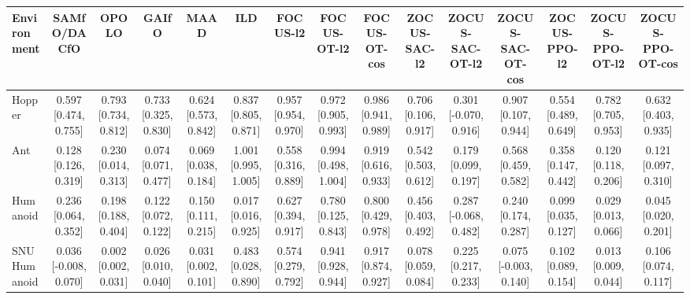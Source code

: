 \begin{tabular}{lcccccccccccccc}
\toprule
Environment & SAMfO/DACfO & OPOLO & GAIfO & MAAD & ILD & FOCUS-l2 & FOCUS-OT-l2 & FOCUS-OT-cos & ZOCUS-SAC-l2 & ZOCUS-SAC-OT-l2 & ZOCUS-SAC-OT-cos & ZOCUS-PPO-l2 & ZOCUS-PPO-OT-l2 & ZOCUS-PPO-OT-cos \\
\midrule
Hopper & 0.597 [0.474, 0.755] & 0.793 [0.734, 0.812] & 0.733 [0.325, 0.830] & 0.624 [0.573, 0.842] & 0.837 [0.805, 0.871] & 0.957 [0.954, 0.970] & 0.972 [0.905, 0.993] & 0.986 [0.941, 0.989] & 0.706 [0.106, 0.917] & 0.301 [-0.070, 0.916] & 0.907 [0.107, 0.944] & 0.554 [0.489, 0.649] & 0.782 [0.705, 0.953] & 0.632 [0.403, 0.935] \\
Ant & 0.128 [0.126, 0.319] & 0.230 [0.014, 0.313] & 0.074 [0.071, 0.477] & 0.069 [0.038, 0.184] & 1.001 [0.995, 1.005] & 0.558 [0.316, 0.889] & 0.994 [0.498, 1.004] & 0.919 [0.616, 0.933] & 0.542 [0.503, 0.612] & 0.179 [0.099, 0.197] & 0.568 [0.459, 0.582] & 0.358 [0.147, 0.442] & 0.120 [0.118, 0.206] & 0.121 [0.097, 0.310] \\
Humanoid & 0.236 [0.064, 0.352] & 0.198 [0.188, 0.404] & 0.122 [0.072, 0.122] & 0.150 [0.111, 0.215] & 0.017 [0.016, 0.925] & 0.627 [0.394, 0.917] & 0.780 [0.125, 0.843] & 0.800 [0.429, 0.978] & 0.456 [0.403, 0.492] & 0.287 [-0.068, 0.482] & 0.240 [0.174, 0.287] & 0.099 [0.035, 0.127] & 0.029 [0.013, 0.066] & 0.045 [0.020, 0.201] \\
SNU Humanoid & 0.036 [-0.008, 0.070] & 0.002 [0.002, 0.031] & 0.026 [0.010, 0.040] & 0.031 [0.002, 0.101] & 0.483 [0.028, 0.890] & 0.574 [0.279, 0.792] & 0.941 [0.928, 0.944] & 0.917 [0.874, 0.927] & 0.078 [0.059, 0.084] & 0.225 [0.217, 0.233] & 0.075 [-0.003, 0.140] & 0.102 [0.089, 0.154] & 0.013 [0.009, 0.044] & 0.106 [0.074, 0.117] \\
\bottomrule
\end{tabular}
